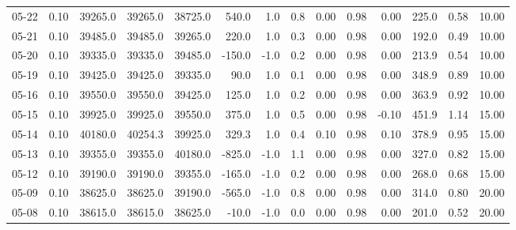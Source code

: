 \begin{threeparttable}
{\begin{tabular}{lrrrrrrrrrrrrr}
  05-22 &     0.10 & 39265.0 & 39265.0 & 38725.0 &      540.0 &                      1.0 &                 0.8 &       0.00 &      0.98 &           0.00 &            225.0 &            0.58 &                  10.00 \\
  05-21 &     0.10 & 39485.0 & 39485.0 & 39265.0 &      220.0 &                      1.0 &                 0.3 &       0.00 &      0.98 &           0.00 &            192.0 &            0.49 &                  10.00 \\
  05-20 &     0.10 & 39335.0 & 39335.0 & 39485.0 &     -150.0 &                     -1.0 &                 0.2 &       0.00 &      0.98 &           0.00 &            213.9 &            0.54 &                  10.00 \\
  05-19 &     0.10 & 39425.0 & 39425.0 & 39335.0 &       90.0 &                      1.0 &                 0.1 &       0.00 &      0.98 &           0.00 &            348.9 &            0.89 &                  10.00 \\
  05-16 &     0.10 & 39550.0 & 39550.0 & 39425.0 &      125.0 &                      1.0 &                 0.2 &       0.00 &      0.98 &           0.00 &            363.9 &            0.92 &                  10.00 \\
  05-15 &     0.10 & 39925.0 & 39925.0 & 39550.0 &      375.0 &                      1.0 &                 0.5 &       0.00 &      0.98 &          -0.10 &            451.9 &            1.14 &                  15.00 \\
  05-14 &     0.10 & 40180.0 & 40254.3 & 39925.0 &      329.3 &                      1.0 &                 0.4 &       0.10 &      0.98 &           0.10 &            378.9 &            0.95 &                  15.00 \\
  05-13 &     0.10 & 39355.0 & 39355.0 & 40180.0 &     -825.0 &                     -1.0 &                 1.1 &       0.00 &      0.98 &           0.00 &            327.0 &            0.82 &                  15.00 \\
  05-12 &     0.10 & 39190.0 & 39190.0 & 39355.0 &     -165.0 &                     -1.0 &                 0.2 &       0.00 &      0.98 &           0.00 &            268.0 &            0.68 &                  15.00 \\
  05-09 &     0.10 & 38625.0 & 38625.0 & 39190.0 &     -565.0 &                     -1.0 &                 0.8 &       0.00 &      0.98 &           0.00 &            314.0 &            0.80 &                  20.00 \\
  05-08 &     0.10 & 38615.0 & 38615.0 & 38625.0 &      -10.0 &                     -1.0 &                 0.0 &       0.00 &      0.98 &           0.00 &            201.0 &            0.52 &                  20.00 \\

\end{tabular}}
\end{threeparttable}
